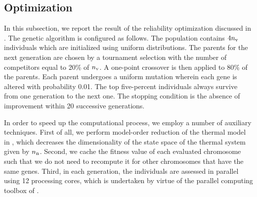 \subsection{Optimization} 
In this subsection, we report the result of the reliability optimization discussed in .
The genetic algorithm is configured as follows.
The population contains $4 {n_\text{v}}$ individuals which are initialized using uniform distributions.
The parents for the next generation are chosen by a tournament selection with the number of competitors equal to 20\% of ${n_\text{v}}$.
A one-point crossover is then applied to 80\% of the parents.
Each parent undergoes a uniform mutation wherein each gene is altered with probability 0.01.
The top five-percent individuals always survive from one generation to the next one.
The stopping condition is the absence of improvement within 20 successive generations.

In order to speed up the computational process, we employ a number of auxiliary techniques.
First of all, we perform model-order reduction of the thermal model in , which decreases the dimensionality of the state space of the thermal system given by ${n_\text{n}}$.
Second, we cache the fitness value of each evaluated chromosome such that we do not need to recompute it for other chromosomes that have the same genes.
Third, in each generation, the individuals are assessed in parallel using 12 processing cores, which is undertaken by virtue of the parallel computing toolbox of  \cite{matlab}.
